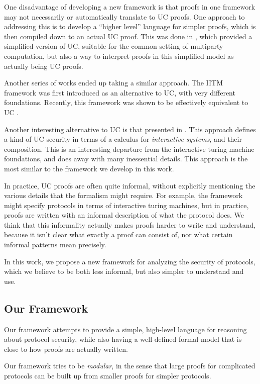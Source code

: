 One disadvantage of developing a new framework is that
proofs in one framework may not necessarily
or automatically translate to UC proofs.
One approach to addressing this is to develop
a ``higher level'' language for simpler proofs,
which is then compiled down to an actual UC proof.
This was done in \cite{C:CanCohLin15},
which provided a simplified version of UC, suitable
for the common setting of multiparty computation,
but also a way to interpret proofs in this simplified
model as actually being UC proofs.

Another series of works ended up taking
a similar approach.
The IITM framework \cite{EPRINT:Kuesters06, JC:KusTueRau20a}
was first introduced as an alternative to UC, with very different foundations.
Recently, this framework was shown to be effectively equivalent to UC
\cite{EC:RauKusChe22}.

Another interesting alternative to UC is that presented in
\cite{cramer2015secure}.
This approach defines a kind of UC security in terms of
a calculus for \emph{interactive systems},
and their composition.
This is an interesting departure from the interactive turing machine
foundations, and does away with many inessential details.
This approach is the most similar to the framework we develop
in this work.

In practice, UC proofs are often quite informal,
without explicitly mentioning the various details that the formalism
might require.
For example, the framework might specify protocols
in terms of interactive turing machines, but in practice,
proofs are written with an informal description of what the protocol
does.
We think that this informality actually
makes proofs harder to write and understand,
because it isn't clear what exactly a proof can consist of,
nor what certain informal patterns mean precisely.

In this work, we propose a new framework for analyzing the security
of protocols, which we believe to be both less informal,
but also simpler to understand and use.

\subsection{Our Framework}

Our framework attempts to provide a simple, high-level language
for reasoning about protocol security, while also having
a well-defined formal model that is close to how proofs
are actually written.

Our framework tries to be \emph{modular}, in the sense that
large proofs for complicated protocols can be built up from smaller proofs
for simpler protocols.

